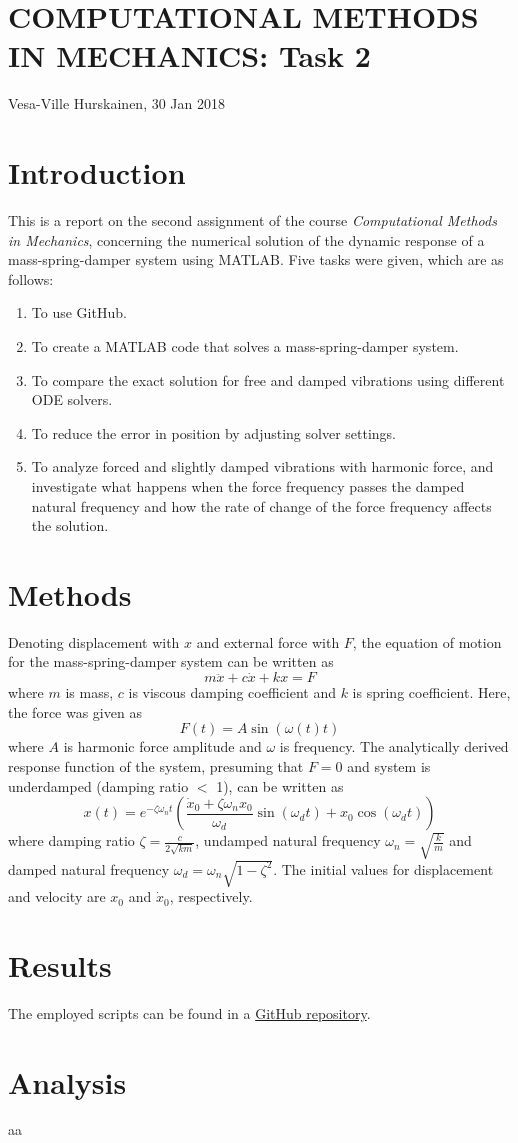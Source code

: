 \documentclass{article}
\begin{document}
	\section*{COMPUTATIONAL METHODS IN MECHANICS: Task 2}
	Vesa-Ville Hurskainen, 30 Jan 2018
	
	\section*{Introduction}
	This is a report on the second assignment of the course \textit{Computational Methods in Mechanics}, concerning the numerical solution of the dynamic response of a mass-spring-damper system using MATLAB. Five tasks were given, which are as follows:
	
	\begin{enumerate}
		\setlength\itemsep{0pt}
		\item To use GitHub.
		\item To create a MATLAB code that solves a mass-spring-damper system.
		\item To compare the exact solution for free and damped vibrations using different ODE solvers.
		\item To reduce the error in position by adjusting solver settings.
		\item To analyze forced and slightly damped vibrations with harmonic force, and investigate what happens when the force frequency passes the damped natural frequency and how the rate of change of the force frequency affects the solution.
	\end{enumerate}
	
	\section*{Methods}
	Denoting displacement with $x$ and external force with $F$, the equation of motion for the mass-spring-damper system can be written as
	\begin{equation}
		m \ddot{x} + c \dot{x} + k x  = F
	\end{equation}
	where $m$ is mass, $c$ is viscous damping coefficient and $k$ is spring coefficient. Here, the force was given as
	\begin{equation}
		F(t) = A \sin(\omega(t) t)
	\end{equation}
	where $A$ is harmonic force amplitude and $\omega$ is frequency. The analytically derived response function of the system, presuming that $F=0$ and system is underdamped (damping ratio $<$ 1), can be written as
	\begin{equation}
		x(t) = e^{-\zeta \omega_n t} \left(\frac{\dot{x}_0 + \zeta \omega_n x_0}{\omega_d} \sin(\omega_d t) + x_0 \cos(\omega_d t)\right)
	\end{equation}
	where damping ratio $\zeta = \frac{c}{2 \sqrt{km}}$, undamped natural frequency $\omega_n = \sqrt{\frac{k}{m}}$ and damped natural frequency $\omega_d = \omega_n \sqrt{1-\zeta^2}$. The initial values for displacement and velocity are $x_0$ and $\dot{x}_0$, respectively.
	
	\section*{Results}
	The employed scripts can be found in a \href{https://github.com/VesaVilleHurskainen/cmim2018}{GitHub repository}.

	\section*{Analysis}
	aa
\end{document}
